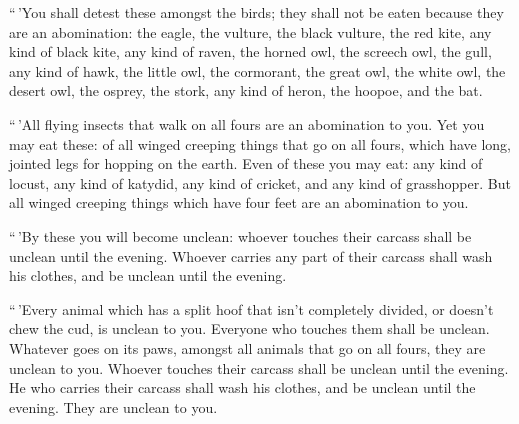 ``\,'You shall detest these amongst the birds; they
shall not be eaten because they are an abomination: the eagle, the
vulture, the black vulture,  the red kite, any kind of
black kite,  any kind of raven,  the
horned owl, the screech owl, the gull, any kind of hawk, 
the little owl, the cormorant, the great owl,  the white
owl, the desert owl, the osprey,  the stork, any kind of
heron, the hoopoe, and the bat.

 ``\,'All flying insects that walk on all fours are an
abomination to you.  Yet you may eat these: of all winged
creeping things that go on all fours, which have long, jointed legs for
hopping on the earth.  Even of these you may eat: any
kind of locust, any kind of katydid, any kind of cricket, and any kind
of grasshopper.  But all winged creeping things which
have four feet are an abomination to you.

 ``\,'By these you will become unclean: whoever touches
their carcass shall be unclean until the evening. 
Whoever carries any part of their carcass shall wash his clothes, and be
unclean until the evening.

 ``\,'Every animal which has a split hoof that isn't
completely divided, or doesn't chew the cud, is unclean to you. Everyone
who touches them shall be unclean.  Whatever goes on its
paws, amongst all animals that go on all fours, they are unclean to you.
Whoever touches their carcass shall be unclean until the evening.
 He who carries their carcass shall wash his clothes, and
be unclean until the evening. They are unclean to you.

